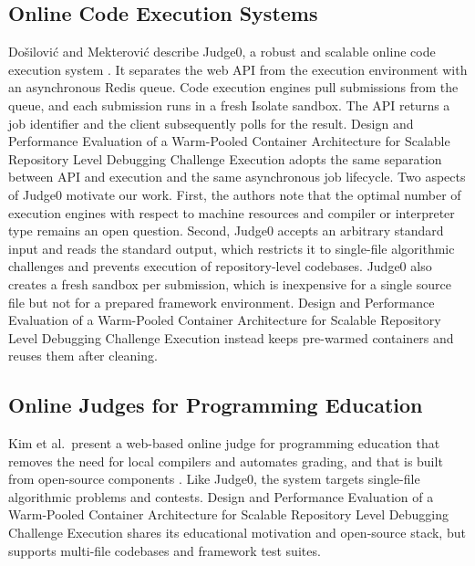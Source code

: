 \documentclass[conference]{IEEEtran}
\begin{document}
\subsection{Online Code Execution Systems}
Do\v{s}ilovi\'{c} and Mekterovi\'{c} describe Judge0, a robust and scalable online code execution system \cite{dosilovic2020}. It separates the web API from the execution environment with an asynchronous Redis queue. Code execution engines pull submissions from the queue, and each submission runs in a fresh Isolate sandbox. The API returns a job identifier and the client subsequently polls for the result. Design and Performance Evaluation of a Warm-Pooled Container Architecture for Scalable Repository Level Debugging Challenge Execution adopts the same separation between API and execution and the same asynchronous job lifecycle. Two aspects of Judge0 motivate our work. First, the authors note that the optimal number of execution engines with respect to machine resources and compiler or interpreter type remains an open question. Second, Judge0 accepts an arbitrary standard input and reads the standard output, which restricts it to single-file algorithmic challenges and prevents execution of repository-level codebases. Judge0 also creates a fresh sandbox per submission, which is inexpensive for a single source file but not for a prepared framework environment. Design and Performance Evaluation of a Warm-Pooled Container Architecture for Scalable Repository Level Debugging Challenge Execution instead keeps pre-warmed containers and reuses them after cleaning.

\subsection{Online Judges for Programming Education}
Kim et al.\ present a web-based online judge for programming education that removes the need for local compilers and automates grading, and that is built from open-source components \cite{kim2022}. Like Judge0, the system targets single-file algorithmic problems and contests. Design and Performance Evaluation of a Warm-Pooled Container Architecture for Scalable Repository Level Debugging Challenge Execution shares its educational motivation and open-source stack, but supports multi-file codebases and framework test suites.
\end{document}
